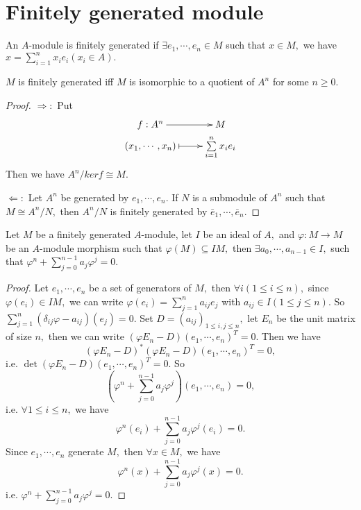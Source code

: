 \newpage

\section{Finitely generated module}

\begin{Def}
An $A$-module is finitely generated if $\exists e_1,\cdots,e_n\in M$
such that $x\in M,$ we have $x=\sum\limits_{i=1}^nx_ie_i(x_i\in A).$
\end{Def}
\begin{prop}
$M$ is finitely generated iff $M$ is isomorphic to a quotient of
$A^n$ for some $n\geqslant0.$
\end{prop}
\begin{proof}
$\Longrightarrow:$ Put
\[ \xymatrix@R=0em{
   f: A^n \ar[r] & M \\
   (x_1,\cdots,x_n) \ar@{|->}[r] & \sum\limits_{i=1}^nx_ie_i }  \]
Then we have $A^n/kerf\cong M.$

$\Longleftarrow:$ Let $A^n$ be generated by $e_1,\cdots,e_n.$ If $N$
is a submodule of $A^n$ such that $M\cong A^n/N,$ then $A^n/N$ is
finitely generated by $\bar{e}_1,\cdots,\bar{e}_n.$
\end{proof}
\begin{prop}
Let $M$ be a finitely generated $A$-module, let $I$ be an ideal of
$A,$ and $\varphi: M\rightarrow M$ be an $A$-module morphism such
that $\varphi(M)\subseteq IM,$ then $\exists a_0,\cdots,a_{n-1}\in
I,$ such that $\varphi^n+\sum\limits_{j=0}^{n-1}a_j\varphi^j=0.$
\end{prop}
\begin{proof}
Let $e_1,\cdots,e_n$ be a set of generators of $M,$ then $\forall
i(1\leqslant i\leqslant n),$ since $\varphi(e_i)\in IM,$ we can
write $\varphi(e_i)=\sum\limits_{j=1}^n a_{ij}e_j$ with $a_{ij}\in
I(1\leqslant j\leqslant n).$ So
$\sum\limits_{j=1}^n(\delta_{ij}\varphi-a_{ij})(e_j)=0.$ Set
$D=(a_{ij})_{1\leqslant i,j\leqslant n},$ let $E_n$ be the unit
matrix of size $n,$ then we can write $(\varphi
E_n-D)(e_1,\cdots,e_n)^T=0.$ Then we have
$$(\varphi E_n-D)^{\ast}(\varphi E_n-D)(e_1,\cdots,e_n)^T=0,$$
i.e. $\det(\varphi E_n-D)(e_1,\cdots,e_n)^T=0.$ So
$$(\varphi^n+\sum\limits_{j=0}^{n-1}a_j\varphi^j)(e_1,\cdots,e_n)=0,$$
i.e. $\forall 1\leqslant i\leqslant n,$ we have
$$\varphi^n(e_i)+\sum\limits_{j=0}^{n-1}a_j\varphi^j(e_i)=0.$$
Since $e_1,\cdots,e_n$ generate $M,$ then $\forall x\in M,$ we have
$$\varphi^n(x)+\sum\limits_{j=0}^{n-1}a_j\varphi^j(x)=0.$$ i.e.
$\varphi^n+\sum\limits_{j=0}^{n-1}a_j\varphi^j=0.$
\end{proof}

